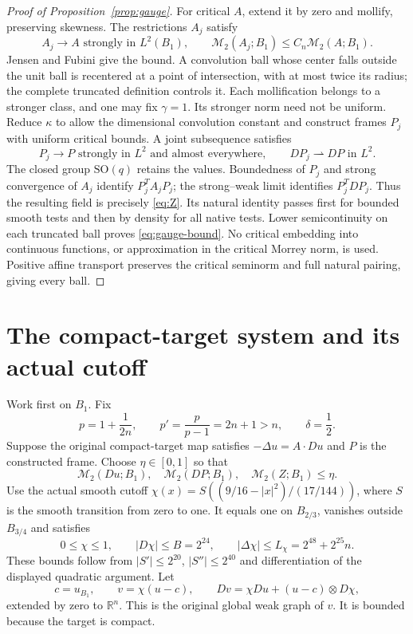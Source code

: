 \documentclass[reqno,11pt]{amsart}
\numberwithin{equation}{section}
\theoremstyle{definition}
\theoremstyle{remark}
\newcommand{\R}{\mathbb R}
\newcommand{\SO}{\mathrm{SO}}
\newcommand{\M}{\mathcal M}
\begin{document}
\begin{proof}[Proof of Proposition~\ref{prop:gauge}]
For critical $A$, extend it by zero and mollify, preserving skewness.
The restrictions $A_j$ satisfy
\[
 A_j\longrightarrow A\text{ strongly in }L^2(B_1),\qquad
 \M_2(A_j;B_1)\leq C_n\M_2(A;B_1).
\]
Jensen and Fubini give the bound. A convolution ball whose center falls
outside the unit ball is recentered at a point of intersection, with
at most twice its radius; the complete truncated definition controls
it. Each mollification belongs to a stronger class, and one may fix
$\gamma=1$. Its stronger norm need not be uniform. Reduce $\kappa$
to allow the dimensional convolution constant and construct frames
$P_j$ with uniform critical bounds. A joint subsequence satisfies
\[
 P_j\to P\text{ strongly in }L^2\text{ and almost everywhere},\qquad
 DP_j\rightharpoonup DP\text{ in }L^2.
\]
The closed group $\SO(q)$ retains the values. Boundedness of $P_j$
and strong convergence of $A_j$ identify $P_j^TA_jP_j$; the strong--weak
limit identifies $P_j^TDP_j$. Thus the resulting field is precisely
\eqref{eq:Z}. Its natural identity passes first for bounded smooth
tests and then by density for all native tests. Lower semicontinuity
on each truncated ball proves \eqref{eq:gauge-bound}.
No critical embedding into continuous functions, or approximation in
the critical Morrey norm, is used. Positive affine transport preserves
the critical seminorm and full natural pairing, giving every ball.
\end{proof}

\section{The compact-target system and its actual cutoff}\label{sec:system}
Work first on $B_1$. Fix
\begin{equation}\label{eq:p}
 p=1+\frac1{2n},\qquad p'=\frac p{p-1}=2n+1>n,\qquad\delta=\frac12.
\end{equation}
Suppose the original compact-target map satisfies
$-\Delta u=A\cdot Du$ and $P$ is the constructed frame. Choose
$\eta\in[0,1]$ so that
\begin{equation}\label{eq:eta}
 \M_2(Du;B_1),\quad\M_2(DP;B_1),\quad\M_2(Z;B_1)\leq\eta.
\end{equation}
Use the actual smooth cutoff
$\chi(x)=S((9/16-|x|^2)/(17/144))$, where $S$ is the smooth
transition from zero to one. It equals one on $B_{2/3}$, vanishes
outside $B_{3/4}$ and satisfies
\begin{equation}\label{eq:fixed-cutoff-numbers}
 0\leq\chi\leq1,\qquad |D\chi|\leq B=2^{24},\qquad
 |\Delta\chi|\leq L_\chi=2^{48}+2^{25}n.
\end{equation}
These bounds follow from $|S'|\leq2^{20}$, $|S''|\leq2^{40}$
and differentiation of the displayed quadratic argument. Let
\begin{equation}\label{eq:cutoff}
 c=u_{B_1},\qquad v=\chi(u-c),\qquad
 Dv=\chi Du+(u-c)\otimes D\chi,
\end{equation}
extended by zero to $\R^n$. This is the original global weak graph of
$v$. It is bounded because the target is compact.
\end{document}
